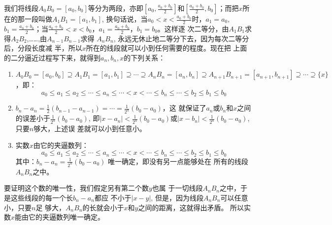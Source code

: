 \begin{figure}[htp]
    \centering
{}   
    \caption{}
\end{figure}

我们将线段$A_0B_0=[a_0,b_0]$等分为两段，亦即$\left[a_0,\frac{a_0+b_0}{2}\right]$和$\left[\frac{a_0+b_0}{2},b_0\right]$；而把$x$所在的那一段叫做$A_1B_1=[a_1,b_1]$, 换句话说，当$a_0<x<\frac{a_0+b_0}{2}$时，$a_1=a_0$, $b_1=\frac{a_0+b_0}{2}$；当$\frac{a_0+b_0}{2}<x<b_0$，$a_1=\frac{a_0+b_0}{2}$，$b_1=b_0$。这样逐
次二等分，由$A_1B_1$求得$A_2B_2$,……,由$A_{n-1}B_{n-1}$求得 $A_nB_n$,
永远无休止地二等分下去，因为每次二等分后，分段长度减
半，所以$x$所在的线段就可以小到任何需要的程度。现在把
上面的二分逼近过程写下来，就得到$a_n,b_n,x$的下列关系：
\begin{enumerate}
    \item $A_0B_0=[a_0, b_0]\supseteq A_1B_1 =[a_1,b_1]
    \supseteq \cdots \supseteq A_nB_n=[a_n, b_n]\supseteq A_{n+1}B_{n+1}=[a_{n+1},b_{n+1}]\supseteq \cdots \supseteq \{x\}$，即：
\[a_0\le a_1\le a_2\le\cdots\le a_n\le \cdots <x<\cdots\le b_n\le\cdots\le b_2\le b_1\le b_0\]

\item $b_n-a_n=\frac{1}{2}(b_{n-1}-a_{n-1})=\cdots=\frac{1}{2^n}(b_0-a_0)$，这
就保证了$a_n$或$b_n$和$x$之间的误差小于$\frac{1}{2^n}(b_0-a_0)$, 即$|x-a_n|<\frac{1}{2^n}(b_0-a_0)$或$|x-b_n|<\frac{1}{2^n}(b_0-a_0)$, 只要$n$够大，上述误
差就可以小到任意小。
\item 实数$x$由它的夹逼数列：
\[a_0\le a_1\le a_2\le\cdots\le a_n\le \cdots <x<\cdots\le b_n\le\cdots\le b_2\le b_1\le b_0\]
其中：$b_n-a_n=\frac{1}{2^n}(b_0-a_0)$
唯一确定，即没有另一点能够处在
所有的线段$A_nB_n$之中。
\end{enumerate}

要证明这个数的唯一性，我们假定另有第二个数$y$也属
于一切线段$A_nB_n$之中，于是这些线段的每一个长$b_n-a_n$都应
不小于$|x-y|$, 但是，因为线段$A_nB_n$可以任意小，只要$n$足
够大，$A_nB_n$的长就会小于$x$和$y$之间的距离，这就得出矛盾。
所以实数$x$能由它的夹逼数列唯一确定。

